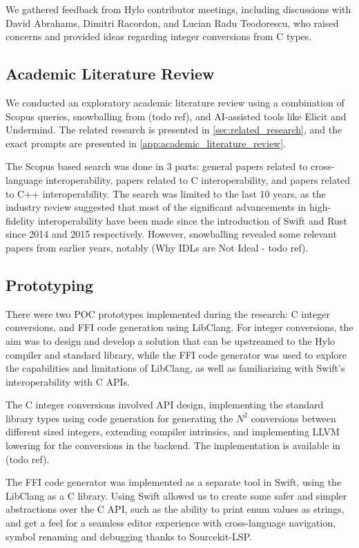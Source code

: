 We gathered feedback from Hylo contributor meetings, including discussions with David Abrahams, Dimitri Racordon, and Lucian Radu Teodorescu, who raised concerns and provided ideas regarding integer conversions from C types.

\subsection{Academic Literature Review}
We conducted an exploratory academic literature review using a combination of Scopus queries, snowballing from (todo ref), and AI-assisted tools like Elicit and Undermind. The related research is presented in \autoref{sec:related_research}, and the exact prompts are presented in \autoref{app:academic_literature_review}.

The Scopus based search was done in 3 parts: general papers related to cross-language interoperability, papers related to C interoperability, and papers related to C++ interoperability. The search was limited to the last 10 years, as the industry review suggested that most of the significant advancements in high-fidelity interoperability have been made since the introduction of Swift and Rust since 2014 and 2015 respectively. However, snowballing revealed some relevant papers from earlier years, notably (Why IDLs are Not Ideal - todo ref).

\subsection{Prototyping}
There were two POC prototypes implemented during the research: C integer conversions, and FFI code generation using LibClang. For integer conversions, the aim was to design and develop a solution that can be upstreamed to the Hylo compiler and standard library, while the FFI code generator was used to explore the capabilities and limitations of LibClang, as well as familiarizing with Swift's interoperability with C APIs.

The C integer conversions involved API design, implementing the standard library types using code generation for generating the $N^2$ conversions between different sized integers, extending compiler intrinsics, and implementing LLVM lowering for the conversions in the backend. The implementation is available in (todo ref).

The FFI code generator was implemented as a separate tool in Swift, using the LibClang as a C library. Using Swift allowed us to create some safer and simpler abstractions over the C API, such as the ability to print enum values as strings, and get a feel for a seamless editor experience with cross-language navigation, symbol renaming and debugging thanks to Sourcekit-LSP.

